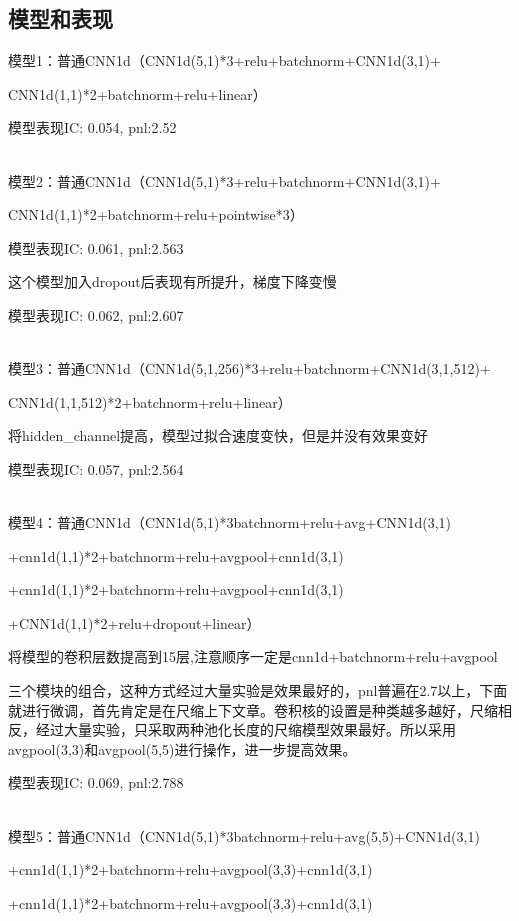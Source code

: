 \documentclass[11pt]{ctexart}
\begin{document}
\subsection{模型和表现}

模型1：普通CNN1d（CNN1d(5,1)*3+relu+batchnorm+CNN1d(3,1)+

CNN1d(1,1)*2+batchnorm+relu+linear）

模型表现{\kaishu \small IC: 0.054, pnl:2.52}

~\\
模型2：普通CNN1d（CNN1d(5,1)*3+relu+batchnorm+CNN1d(3,1)+

CNN1d(1,1)*2+batchnorm+relu+pointwise*3）

模型表现{\kaishu \small IC: 0.061, pnl:2.563}

这个模型加入dropout后表现有所提升，梯度下降变慢

模型表现{\kaishu \small IC: 0.062, pnl:2.607}

~\\
模型3：普通CNN1d（CNN1d(5,1,256)*3+relu+batchnorm+CNN1d(3,1,512)+

CNN1d(1,1,512)*2+batchnorm+relu+linear）

将hidden\_channel提高，模型过拟合速度变快，但是并没有效果变好

模型表现{\kaishu \small IC: 0.057, pnl:2.564}

~\\
模型4：普通CNN1d（CNN1d(5,1)*3batchnorm+relu+avg+CNN1d(3,1)

+cnn1d(1,1)*2+batchnorm+relu+avgpool+cnn1d(3,1)

+cnn1d(1,1)*2+batchnorm+relu+avgpool+cnn1d(3,1)

+CNN1d(1,1)*2+relu+dropout+linear）

将模型的卷积层数提高到15层,注意顺序一定是cnn1d+batchnorm+relu+avgpool

三个模块的组合，这种方式经过大量实验是效果最好的，pnl普遍在2.7以上，下面就进行微调，首先肯定是在尺缩上下文章。卷积核的设置是种类越多越好，尺缩相反，经过大量实验，只采取两种池化长度的尺缩模型效果最好。所以采用avgpool(3,3)和avgpool(5,5)进行操作，进一步提高效果。

模型表现{\kaishu \small IC: 0.069, pnl:2.788}

~\\
模型5：普通CNN1d（CNN1d(5,1)*3batchnorm+relu+avg(5,5)+CNN1d(3,1)

+cnn1d(1,1)*2+batchnorm+relu+avgpool(3,3)+cnn1d(3,1)

+cnn1d(1,1)*2+batchnorm+relu+avgpool(3,3)+cnn1d(3,1)
\end{document}
